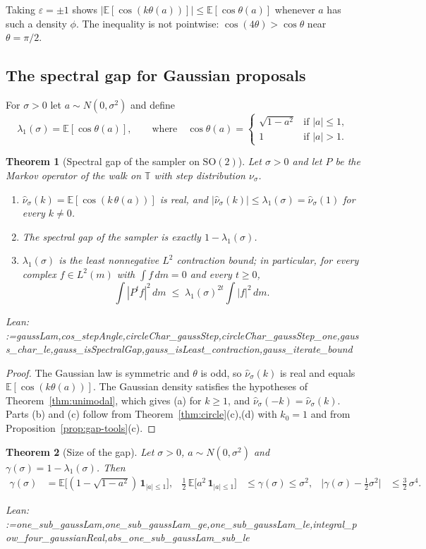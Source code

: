 \documentclass[11pt]{amsart}
\makeatletter
\newtheorem{theorem}{Theorem}[section]
\theoremstyle{definition}
\theoremstyle{remark}
\newcommand{\@leanlist}[1]{\def\@leansep{}\@for\@leanname:=#1\do{\@leansep
  \texttt{\expandafter\detokenize\expandafter{\@leanname}}\def\@leansep{, }}}
\newcommand{\lean}[1]{\par\smallskip\noindent
  {\footnotesize\normalfont\raggedright\textsf{Lean:} \@leanlist{#1}\par}}
\newcommand{\T}{\mathbb{T}}
\newcommand{\E}{\mathbb{E}}
\newcommand{\SO}{\mathrm{SO}}
\newcommand{\one}{\mathbf{1}}
\makeatother
\begin{document}
Taking $\varepsilon=\pm1$ shows $|\E[\cos(k\theta(a))]|\le\E[\cos\theta(a)]$ whenever $a$ has
such a density $\phi$.  The inequality is not pointwise: $\cos(4\theta)>\cos\theta$ near
$\theta=\pi/2$.

\subsection{The spectral gap for Gaussian proposals}\label{sec:so2-gauss}
For $\sigma>0$ let $a\sim N(0,\sigma^2)$ and define
\[
  \lambda_1(\sigma)=\E[\cos\theta(a)],\qquad\text{where}\quad
  \cos\theta(a)=\begin{cases}\sqrt{1-a^2}&\text{if }|a|\le1,\\ 1&\text{if }|a|>1.\end{cases}
\]

\begin{theorem}[Spectral gap of the sampler on $\SO(2)$]\label{thm:so2-gap}
Let $\sigma>0$ and let $P$ be the Markov operator of the walk on $\T$ with step distribution
$\nu_\sigma$.
\begin{enumerate}
\item[(a)] $\hat\nu_\sigma(k)=\E[\cos(k\,\theta(a))]$ is real, and
$|\hat\nu_\sigma(k)|\le\lambda_1(\sigma)=\hat\nu_\sigma(1)$ for every $k\ne0$.
\item[(b)] The spectral gap of the sampler is exactly $1-\lambda_1(\sigma)$.
\item[(c)] $\lambda_1(\sigma)$ is the least nonnegative $L^2$ contraction bound; in particular,
for every complex $f\in L^2(m)$ with $\int f\,dm=0$ and every $t\ge0$,
\[
  \int|P^tf|^2\,dm\;\le\;\lambda_1(\sigma)^{2t}\int|f|^2\,dm .
\]
\end{enumerate}
\lean{gaussLam,cos_stepAngle,circleChar_gaussStep,circleChar_gaussStep_one,gauss_char_le,gauss_isSpectralGap,gauss_isLeast_contraction,gauss_iterate_bound}
\end{theorem}

\begin{proof}
The Gaussian law is symmetric and $\theta$ is odd, so $\hat\nu_\sigma(k)$ is real and equals
$\E[\cos(k\theta(a))]$.  The Gaussian density satisfies the hypotheses of
Theorem~\ref{thm:unimodal}, which gives (a) for $k\ge1$, and
$\hat\nu_\sigma(-k)=\hat\nu_\sigma(k)$.  Parts (b) and (c) follow from
Theorem~\ref{thm:circle}(c),(d) with $k_0=1$ and from Proposition~\ref{prop:gap-tools}(c).
\end{proof}

\begin{theorem}[Size of the gap]\label{thm:so2-size}
Let $\sigma>0$, $a\sim N(0,\sigma^2)$ and $\gamma(\sigma)=1-\lambda_1(\sigma)$.  Then
\begin{align*}
  \gamma(\sigma)&=\E\bigl[(1-\sqrt{1-a^2})\,\one_{|a|\le1}\bigr], &
  \tfrac12\,\E\bigl[a^2\,\one_{|a|\le1}\bigr]&\le\gamma(\sigma)\le\sigma^2, &
  \bigl|\gamma(\sigma)-\tfrac12\sigma^2\bigr|&\le\tfrac32\,\sigma^4 .
\end{align*}
\lean{one_sub_gaussLam,one_sub_gaussLam_ge,one_sub_gaussLam_le,integral_pow_four_gaussianReal,abs_one_sub_gaussLam_sub_le}
\end{theorem}
\end{document}
